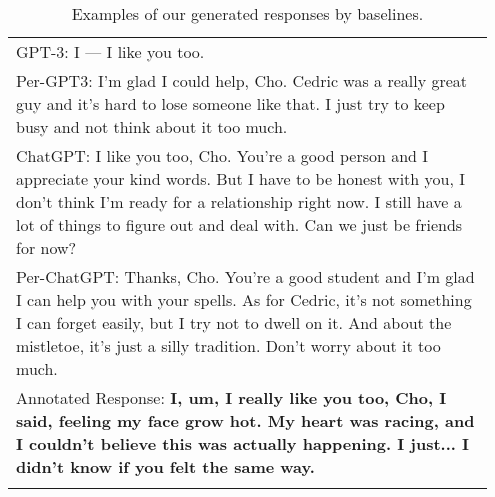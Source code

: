 \documentclass[11pt]{article}
\begin{document}
\begin{table*}[!t]
\begin{tabular}{p{0.95\linewidth}}
GPT-3: I — I like you too.\\

Per-GPT3: I'm glad I could help, Cho. Cedric was a really great guy and it's hard to lose someone like that. I just try to keep busy and not think about it too much.\\

ChatGPT: I like you too, Cho. You're a good person and I appreciate your kind words. But I have to be honest with you, I don't think I'm ready for a relationship right now. I still have a lot of things to figure out and deal with. Can we just be friends for now? \\

Per-ChatGPT: Thanks, Cho. You're a good student and I'm glad I can help you with your spells. As for Cedric, it's not something I can forget easily, but I try not to dwell on it. And about the mistletoe, it's just a silly tradition. Don't worry about it too much. \\

Annotated Response: \textbf{I, um, I really like you too, Cho, I said, feeling my face grow hot. My heart was racing, and I couldn't believe this was actually happening. I just... I didn't know if you felt the same way.}
\\
\bottomrule
\caption{Examples of our generated responses by baselines.  } 
\label{table:case_study2}
\end{tabular}

\vspace{-5mm}
\end{table*} 

 \label{sec:appendix}
\end{document}

